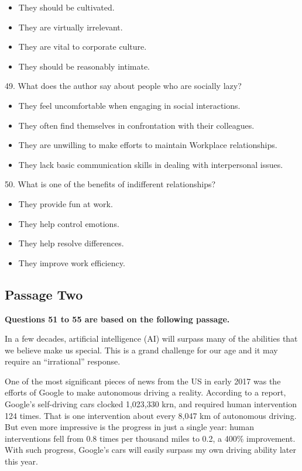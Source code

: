 \documentclass[UTF8,11pt]{ctexart}
\begin{document}
\begin{itemize}[leftmargin=2em,itemsep=.2em,topsep=.4em]\item[A.] They should be cultivated.
\item[B.] They are virtually irrelevant.
\item[C.] They are vital to corporate culture.
\item[D.] They should be reasonably intimate.
\end{itemize}

49. What does the author say about people who are socially lazy?


\begin{itemize}[leftmargin=2em,itemsep=.2em,topsep=.4em]\item[A.] They feel uncomfortable when engaging in social interactions.
\item[B.] They often find themselves in confrontation with their colleagues.
\item[C.] They are unwilling to make efforts to maintain Workplace relationships.
\item[D.] They lack basic communication skills in dealing with interpersonal issues.
\end{itemize}

50. What is one of the benefits of indifferent relationships?


\begin{itemize}[leftmargin=2em,itemsep=.2em,topsep=.4em]\item[A.] They provide fun at work.
\item[B.] They help control emotions.
\item[C.] They help resolve differences.
\item[D.] They improve work efficiency.
\end{itemize}

\subsection*{\textbf{Passage Two}}


\textbf{Questions 51 to 55 are based on the following passage.}


In a few decades, artificial intelligence (AI) will surpass many of the abilities that we believe make us special. This is a grand challenge for our age and it may require an “irrational” response.


One of the most significant pieces of news from the US in early 2017 was the efforts of Google to make autonomous driving a reality. According to a report, Google’s self-driving cars clocked 1,023,330 krn, and required human intervention 124 times. That is one intervention about every 8,047 km of autonomous driving. But even more impressive is the progress in just a single year: human interventions fell from 0.8 times per thousand miles to 0.2, a 400\% improvement. With such progress, Google’s cars will easily surpass my own driving ability later this year.
\end{document}
